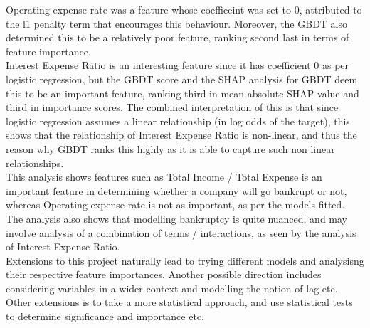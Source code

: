 \documentclass[11pt]{article}
\begin{document}
Operating expense rate was a feature whose coefficeint was set to $0$, attributed to the l1 penalty term that encourages this behaviour. Moreover, the GBDT also determined this to be a relatively poor feature, ranking second last in terms of feature importance.  \\

Interest Expense Ratio is an interesting feature since it has coefficient 0 as per logistic regression, but the GBDT score and the SHAP analysis for GBDT deem this to be an important feature, ranking third in mean absolute SHAP value and third in importance scores. The combined interpretation of this is that since logistic regression assumes a linear relationship (in log odds of the target), this shows that the relationship of Interest Expense Ratio is non-linear, and thus the reason why GBDT ranks this highly as it is able to capture such non linear relationships. \\

This analysis shows features such as Total Income / Total Expense is an important feature in determining whether a company will go bankrupt or not, whereas Operating expense rate is not as important, as per the models fitted. The analysis also shows that modelling bankruptcy is quite nuanced, and may involve analysis of a combination of terms / interactions, as seen by the analysis of Interest Expense Ratio. \\

Extensions to this project naturally lead to trying different models and analysisng their respective feature importances. Another possible direction includes considering variables in a wider context and modelling the notion of lag etc. Other extensions is to take a more statistical approach, and use statistical tests to determine significance and importance etc. 


\end{document}
